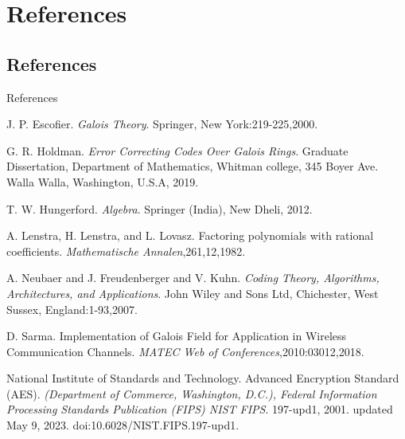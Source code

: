 \documentclass{beamer}
\begin{document}
  \section{References}
  \subsection{References}
\begin{frame}{References}
  \footnotesize

  \begin{thebibliography}{9}

    J. P. Escofier. \emph{Galois Theory}. Springer, New York:219-225,2000.

    G. R. Holdman. \emph{Error Correcting Codes  Over Galois Rings}. Graduate Dissertation, Department of Mathematics, Whitman college, 345 Boyer Ave.
    Walla Walla, Washington, U.S.A, 2019.

    T. W. Hungerford. \emph{Algebra}. Springer (India), New Dheli, 2012.

    A. Lenstra, H. Lenstra, and L. Lovasz. Factoring polynomials with rational coefficients. \emph{Mathematische Annalen},261,12,1982.

    A. Neubaer and J. Freudenberger and V. Kuhn. \emph{Coding Theory, Algorithms, Architectures, and Applications}. John Wiley and Sons Ltd, Chichester, West Sussex, England:1-93,2007.

    D. Sarma. Implementation of Galois Field for Application in Wireless Communication Channels. \emph{MATEC Web of Conferences},2010:03012,2018.

    National Institute of Standards and Technology. Advanced Encryption
    Standard (AES). \emph{(Department of Commerce, Washington, D.C.), Federal Information Processing Standards Publication (FIPS) NIST FIPS}. 197-upd1, 2001. updated May 9, 2023. doi:10.6028/NIST.FIPS.197-upd1.
  \end{thebibliography}
\end{frame}
\end{document}
